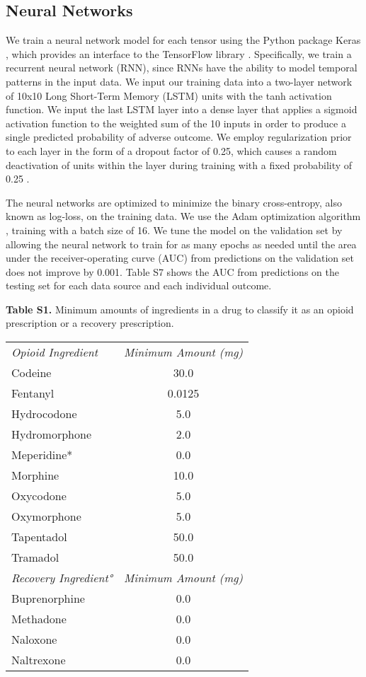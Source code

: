 \documentclass[9pt,twoside,lineno]{pnas-new}
\begin{document}
\subsection{Neural Networks}

We train a neural network model for each tensor using the Python package Keras \cite{chollet}, which provides an interface to the TensorFlow library \cite{abadi}. Specifically, we train a recurrent neural network (RNN), since RNNs have the ability to model temporal patterns in the input data. We input our training data into a two-layer network of 10x10 Long Short-Term Memory (LSTM) \cite{hochreiter} units with the tanh activation function. We input the last LSTM layer into a dense layer that applies a sigmoid activation function to the weighted sum of the 10 inputs in order to produce a single predicted probability of adverse outcome. We employ regularization prior to each layer in the form of a dropout factor of 0.25, which causes a random deactivation of units within the layer during training with a fixed probability of 0.25 \cite{srivastava}.

The neural networks are optimized to minimize the binary cross-entropy, also known as log-loss, on the training data. We use the Adam optimization algorithm \cite{kingma}, training with a batch size of 16. We tune the model on the validation set by allowing the neural network to train for as many epochs as needed until the area under the receiver-operating curve (AUC) from predictions on the validation set does not improve by 0.001. Table S7 shows the AUC from predictions on the testing set for each data source and each individual outcome.

\newpage

\textbf{Table S1.} Minimum amounts of ingredients in a drug to classify it as an opioid prescription or a recovery prescription.

\begin{tabular}{lc}
\em Opioid Ingredient & \em Minimum Amount (mg) \\[0.5em]
Codeine & 30.0 \\
Fentanyl & 0.0125 \\
Hydrocodone & 5.0 \\
Hydromorphone & 2.0 \\
Meperidine* & 0.0 \\
Morphine & 10.0 \\
Oxycodone & 5.0 \\
Oxymorphone & 5.0 \\
Tapentadol & 50.0 \\
Tramadol & 50.0 \\[1em]
\em Recovery Ingredient° & \em Minimum Amount (mg) \\[0.5em]
Buprenorphine & 0.0 \\
Methadone & 0.0 \\
Naloxone & 0.0 \\
Naltrexone & 0.0 \\[1em]
\end{tabular}
\end{document}
